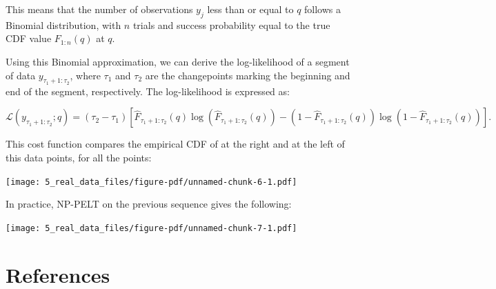 \documentclass[
  letterpaper,
  DIV=11,
  numbers=noendperiod]{scrreprt}
\newenvironment{Shaded}{\begin{snugshade}}{\end{snugshade}}
\newcommand{\AttributeTok}[1]{\textcolor[rgb]{0.40,0.45,0.13}{#1}}
\newcommand{\DecValTok}[1]{\textcolor[rgb]{0.68,0.00,0.00}{#1}}
\newcommand{\FunctionTok}[1]{\textcolor[rgb]{0.28,0.35,0.67}{#1}}
\newcommand{\NormalTok}[1]{\textcolor[rgb]{0.00,0.23,0.31}{#1}}
\newcommand{\OtherTok}[1]{\textcolor[rgb]{0.00,0.23,0.31}{#1}}
\newcommand{\SpecialCharTok}[1]{\textcolor[rgb]{0.37,0.37,0.37}{#1}}
\newcommand{\StringTok}[1]{\textcolor[rgb]{0.13,0.47,0.30}{#1}}
\begin{document}
This means that the number of observations \(y_j\) less than or equal to
\(q\) follows a Binomial distribution, with \(n\) trials and success
probability equal to the true CDF value \(F_{1:n}(q)\) at \(q\).

Using this Binomial approximation, we can derive the log-likelihood of a
segment of data \(y_{\tau_1+1:\tau_2}\), where \(\tau_1\) and \(\tau_2\)
are the changepoints marking the beginning and end of the segment,
respectively. The log-likelihood is expressed as:

\[
\mathcal{L}(y_{\tau_1+1:\tau_2}; q) = (\tau_2 - \tau_1) \left[\hat{F}_{\tau_1+1:\tau_2}(q) \log(\hat{F}_{\tau_1+1:\tau_2}(q)) - (1-\hat{F}_{\tau_1+1:\tau_2}(q))\log(1-\hat{F}_{\tau_1+1:\tau_2}(q)) \right].
\]

This cost function compares the empirical CDF of at the right and at the
left of this data points, for all the points:

\texttt{[image: 5\_real\_data\_files/figure-pdf/unnamed-chunk-6-1.pdf]}

In practice, NP-PELT on the previous sequence gives the following:

\begin{Shaded}
\end{Shaded}

\texttt{[image: 5\_real\_data\_files/figure-pdf/unnamed-chunk-7-1.pdf]}


\chapter*{References}\label{references}

\end{document}

